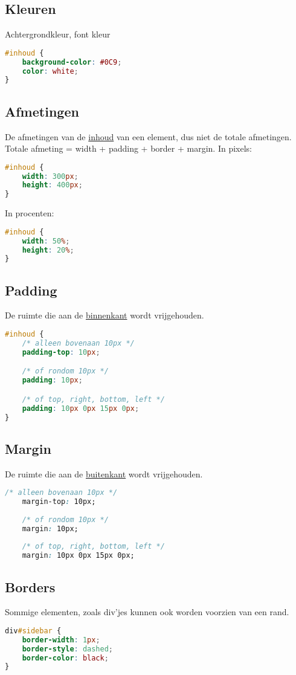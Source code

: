 \documentclass[8pt,pagesize,footinclude=false,headinclude=false]{scrartcl}
\begin{document}
\begin{multicols*}{4}
\subsection*{Kleuren}
Achtergrondkleur, font kleur
\begin{lstlisting}[language=CSS]
#inhoud {
	background-color: #0C9;
	color: white;
}
\end{lstlisting}

\subsection*{Afmetingen}
De afmetingen van de \underline{inhoud} van een element, dus niet de totale afmetingen. Totale afmeting = width + padding + border + margin.
In pixels:
\begin{lstlisting}[language=CSS]
#inhoud {
	width: 300px;
	height: 400px;
}
\end{lstlisting}

\noindent In procenten:
\begin{lstlisting}[language=CSS]
#inhoud {
	width: 50%;
	height: 20%;
}
\end{lstlisting}

\subsection*{Padding}
De ruimte die aan de \underline{binnenkant} wordt vrijgehouden.
\begin{lstlisting}[language=CSS]
#inhoud {
	/* alleen bovenaan 10px */
	padding-top: 10px; 

	/* of rondom 10px */
	padding: 10px; 

	/* of top, right, bottom, left */
	padding: 10px 0px 15px 0px; 
}
\end{lstlisting}

\subsection*{Margin}
De ruimte die aan de \underline{buitenkant} wordt vrijgehouden.
\begin{lstlisting}[language=CSS]
	/* alleen bovenaan 10px */
	margin-top: 10px; 
	
	/* of rondom 10px */
	margin: 10px; 
	
	/* of top, right, bottom, left */
	margin: 10px 0px 15px 0px; 
\end{lstlisting}

\subsection*{Borders}
Sommige elementen, zoals div'jes kunnen ook worden voorzien van een rand.
\begin{lstlisting}[language=CSS]
div#sidebar {
	border-width: 1px;
	border-style: dashed;
	border-color: black;
}
\end{lstlisting}


\end{multicols*}
\end{document}
